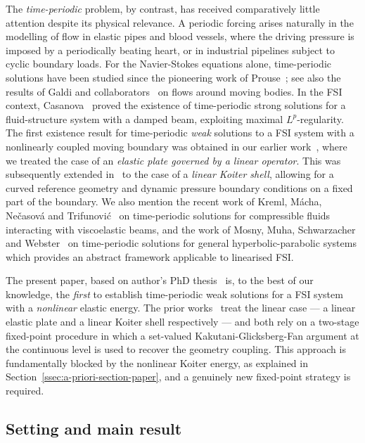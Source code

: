 \documentclass[10pt,a4paper]{article}
\numberwithin{equation}{section}
\begin{document}
The \emph{time-periodic} problem, by contrast, has received comparatively little attention
despite its physical relevance. A periodic forcing arises naturally in the modelling of
flow in elastic pipes and blood vessels, where the driving pressure is imposed by a
periodically beating heart, or in industrial pipelines subject to cyclic boundary loads.
For the Navier-Stokes equations alone, time-periodic solutions have been studied since the
pioneering work of Prouse~\cite{Pr63}; see also the results of Galdi and
collaborators~\cite{GS06, G13, G20} on flows around moving bodies. In the FSI context,
Casanova~\cite{Casanova} proved the existence of time-periodic strong solutions
for a fluid-structure system with a damped beam, exploiting maximal $L^p$-regularity.
The first existence result for time-periodic \emph{weak} solutions to a FSI system
with a nonlinearly coupled moving boundary was obtained in our earlier
work~\cite{Claudiu22}, where we treated the case of an \emph{elastic plate governed
by a linear operator}. This was subsequently extended in~\cite{mindrila-schwarz-shell}
to the case of a \emph{linear Koiter shell}, allowing for a curved reference geometry
and dynamic pressure boundary conditions on a fixed part of the boundary.
We also mention the recent work of Kreml, M\'{a}cha, Ne\v{c}asov\'{a} and
Trifunovi\'{c}~\cite{kreml} on time-periodic solutions for compressible fluids
interacting with viscoelastic beams, and the work of Mosny, Muha, Schwarzacher and
Webster~\cite{mosny2024time} on time-periodic solutions for general hyperbolic-parabolic
systems which provides an abstract framework applicable to linearised FSI.

The present paper, based on author's PhD thesis~\cite{thesis-mindrila} is, to the best of our knowledge, the \emph{first} to establish
time-periodic weak solutions for a FSI system with a \emph{nonlinear} elastic energy.
The prior works~\cite{Claudiu22, mindrila-schwarz-shell} treat the linear case —
a linear elastic plate and a linear Koiter shell respectively — and both rely on
a two-stage fixed-point procedure in which a set-valued Kakutani-Glicksberg-Fan
argument at the continuous level is used to recover the geometry coupling.
This approach is fundamentally blocked by the nonlinear Koiter energy, as explained
in Section~\ref{ssec:a-priori-section-paper}, and a genuinely new fixed-point strategy
is required.

\subsection{Setting and main result}
\end{document}
